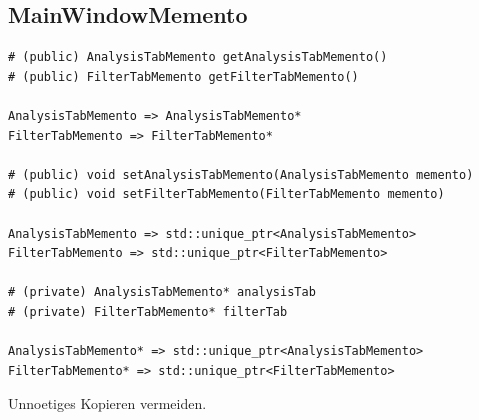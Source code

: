 \documentclass[parskip=full]{scrartcl}
\begin{document}
\subsection{MainWindowMemento}
\begin{verbatim}
# (public) AnalysisTabMemento getAnalysisTabMemento()
# (public) FilterTabMemento getFilterTabMemento()

AnalysisTabMemento => AnalysisTabMemento*
FilterTabMemento => FilterTabMemento*

# (public) void setAnalysisTabMemento(AnalysisTabMemento memento)
# (public) void setFilterTabMemento(FilterTabMemento memento)

AnalysisTabMemento => std::unique_ptr<AnalysisTabMemento>
FilterTabMemento => std::unique_ptr<FilterTabMemento>

# (private) AnalysisTabMemento* analysisTab
# (private) FilterTabMemento* filterTab

AnalysisTabMemento* => std::unique_ptr<AnalysisTabMemento>
FilterTabMemento* => std::unique_ptr<FilterTabMemento>

\end{verbatim}
Unnoetiges Kopieren vermeiden.
\end{document}

